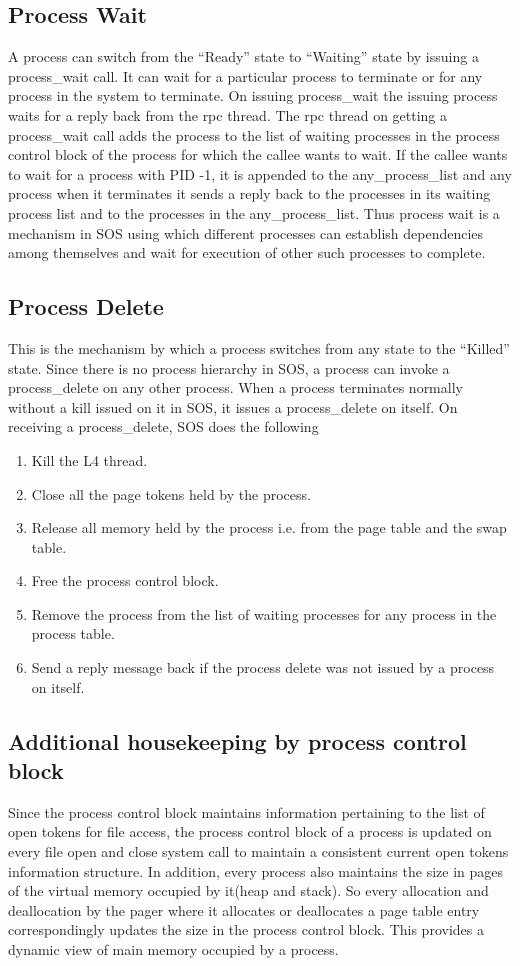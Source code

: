 \documentclass[a4paper, 11pt]{article}
\begin{document}
\subsection{Process Wait}
A process can switch from the ``Ready'' state to ``Waiting'' state by
issuing a process\_wait call. It can wait for a particular process to
terminate or for any process in the system to terminate. On issuing
process\_wait the issuing process waits for a reply back from the rpc
thread. The rpc thread on getting a process\_wait call adds the
process to the list of waiting processes in the process control block of the
process for which the callee wants to wait. If the callee wants to
wait for a process with PID -1, it is appended to the
any\_process\_list and any process when it terminates it sends a reply
back to the processes in its waiting process list and to the processes in the
any\_process\_list. Thus process wait is a mechanism in SOS using
which different processes can establish dependencies among themselves
and wait for execution of other such processes to complete.
\subsection{Process Delete}
This is the mechanism by which a process switches from any state to
the ``Killed'' state. Since there is no process hierarchy in SOS, a
process can invoke a process\_delete on any other process. When a
process terminates normally without a kill issued on it in SOS, it
issues a process\_delete on itself. On receiving a process\_delete,
SOS does the following
\begin{enumerate}
\item Kill the L4 thread.
\item Close all the page tokens held by the process.
\item Release all memory held by the process i.e. from the page table
  and the swap table.
\item Free the process control block.
\item Remove the process from the list of waiting processes for any
  process in the process table.
\item Send a reply message back if the process delete was not issued
  by a process on itself.
\end{enumerate}
\subsection{Additional housekeeping by process control block}
Since the process control block maintains information pertaining to
the list of open tokens for file access, the process control block of
a process is updated on every file open and close system call to
maintain a consistent current open tokens information structure. In addition,
every process also maintains the size in pages of the virtual memory
occupied by it(heap and stack). So every allocation and deallocation
by the pager where it allocates or deallocates a page table entry
correspondingly updates the size in the process control block. This
provides a dynamic view of main memory occupied by a process. 
\newpage
\end{document}
